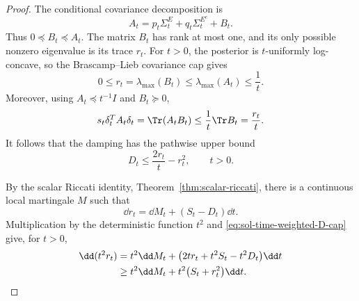 \documentclass[../main.tex]{subfiles}
\begin{document}
\begin{proof}
The conditional covariance decomposition is
\begin{equation}
 A_t=p_t\Sigma_t^E+q_t\Sigma_t^{E^c}+B_t.
 \label{eq:sol-time-weighted-decomposition}
\end{equation}
Thus $0\preceq B_t\preceq A_t$.  The matrix $B_t$ has rank at most one, and its only possible
nonzero eigenvalue is its trace $r_t$.  For $t>0$, the posterior is $t$-uniformly log-concave,
so the Brascamp--Lieb covariance cap gives
\begin{equation}
 0\le r_t=\lambda_{\max}(B_t)\le\lambda_{\max}(A_t)\le\frac1t.
 \label{eq:sol-time-weighted-r-cap}
\end{equation}
Moreover, using $A_t\preceq t^{-1}I$ and $B_t\succeq0$,
\[
 s_t\delta_t^TA_t\delta_t=\Tr(A_tB_t)
 \le\frac1t\Tr B_t=\frac{r_t}{t}.
\]
It follows that the damping has the pathwise upper bound
\begin{equation}
 D_t\le\frac{2r_t}{t}-r_t^2,
 \qquad t>0.
 \label{eq:sol-time-weighted-D-cap}
\end{equation}

By the scalar Riccati identity, Theorem~\ref{thm:scalar-riccati}, there is a continuous local
martingale $M$ such that
\[
 \dd r_t=\dd M_t+(S_t-D_t)\dd t.
\]
Multiplication by the deterministic function $t^2$ and
\eqref{eq:sol-time-weighted-D-cap} give, for $t>0$,
\begin{align}
 \dd(t^2r_t)
 &=t^2\dd M_t+
   \bigl(2tr_t+t^2S_t-t^2D_t\bigr)\dd t \notag\\
 &\ge t^2\dd M_t+t^2\bigl(S_t+r_t^2\bigr)\dd t.
 \label{eq:sol-time-weighted-product}
\end{align}


\end{proof}
\end{document}
